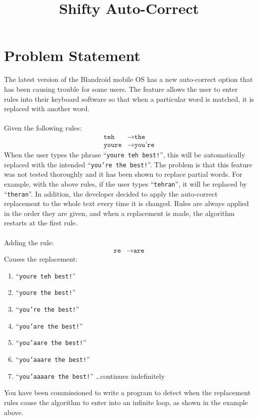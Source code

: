 \documentclass[11pt]{article}
\title{\textbf{Shifty Auto-Correct}}
\date{}
\begin{document}
\maketitle

\section{Problem Statement}
The latest version of the Blandroid mobile OS has a new auto-correct
option that has been causing trouble for some users. The feature allows
the user to enter rules into their keyboard software so that when a particular
word is matched, it is replaced with another word.
\\\\
Given the following rules:
\begin{align}
\texttt{teh} &\rightarrow \texttt{the} \\
\texttt{youre} &\rightarrow \texttt{you're}
\end{align}
When the user types the phrase ``\texttt{youre teh best!}'', this will be
automatically replaced with the intended ``\texttt{you're the best!}''. The
problem is that this feature was not tested thoroughly and it has been shown
to replace partial words. For example, with the above rules, if the user
types ``\texttt{tehran}'', it will be replaced by ``\texttt{theran}''. In
addition, the developer decided to apply the auto-correct replacement to the
whole text every time it is changed. Rules are always applied in the order they
are given, and when a replacement is made, the algorithm restarts at the first rule.
\\\\
Adding the rule:
\begin{align}
\texttt{re} &\rightarrow \texttt{are}
\end{align}
Causes the replacement:
\begin{enumerate}
\item ``\texttt{youre teh best!}''
\item ``\texttt{youre the best!}''
\item ``\texttt{you're the best!}''
\item ``\texttt{you'are the best!}''
\item ``\texttt{you'aare the best!}''
\item ``\texttt{you'aaare the best!}''
\item ``\texttt{you'aaaare the best!}'' \ldots continues indefinitely
\end{enumerate}
\bigskip
You have been commissioned to write a program to detect when the replacement
rules cause the algorithm to enter into an infinite loop, as shown in the
example above.
\end{document}
